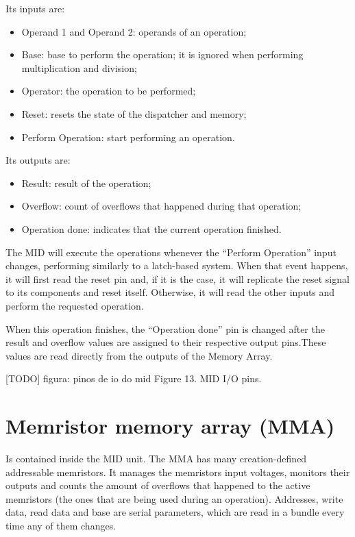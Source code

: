 \documentclass[ecp,tc,english]{iiufrgs}
\begin{document}
Its inputs are:

\begin{itemize}
    \item Operand 1 and Operand 2: operands of an operation;
    \item Base: base to perform the operation; it is ignored when performing multiplication and division;
    \item Operator: the operation to be performed;
    \item Reset: resets the state of the dispatcher and memory;
    \item Perform Operation: start performing an operation.
\end{itemize}

Its outputs are:

\begin{itemize}
    \item Result: result of the operation;
    \item Overflow: count of overflows that happened during that operation;
    \item Operation done: indicates that the current operation finished.
\end{itemize}

The MID will execute the operations whenever the “Perform Operation” input changes, performing similarly to a latch-based system. When that event happens, it will first read the reset pin and, if it is the case, it will replicate the reset signal to its components and reset itself. Otherwise, it will read the other inputs and perform the requested operation.

When this operation finishes, the “Operation done” pin is changed after the result and overflow values are assigned to their respective output pins.These values are read directly from the outputs of the Memory Array.

[TODO] figura: pinos de io do mid
Figure 13. MID I/O pins.

\section{Memristor memory array (MMA)}

Is contained inside the MID unit. The MMA has many creation-defined addressable memristors. It manages the memristors input voltages, monitors their outputs and counts the amount of overflows that happened to the active memristors (the ones that are being used during an operation). Addresses, write data, read data and base are serial parameters, which are read in a bundle every time any of them changes.
\end{document}

